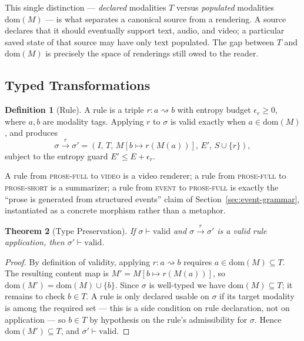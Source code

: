\documentclass[11pt]{article}
\newtheorem{theorem}{Theorem}[section]
\theoremstyle{definition}
\newtheorem{definition}[theorem]{Definition}
\begin{document}
This single distinction --- \emph{declared} modalities $T$ versus \emph{populated} modalities $\mathrm{dom}(M)$ --- is what separates a canonical source from a rendering. A source declares that it should eventually support text, audio, and video; a particular saved state of that source may have only text populated. The gap between $T$ and $\mathrm{dom}(M)$ is precisely the space of renderings still owed to the reader.

\subsection{Typed Transformations}

\begin{definition}[Rule]
\label{def:rule}
A rule is a triple $r : a \rightsquigarrow b$ with entropy budget $\epsilon_r \geq 0$, where $a, b$ are modality tags. Applying $r$ to $\sigma$ is valid exactly when $a \in \mathrm{dom}(M)$, and produces
\[
\sigma \xrightarrow{r} \sigma' = (I,\, T,\, M[b \mapsto r(M(a))],\, E',\, S \cup \{r\}),
\]
subject to the entropy guard $E' \leq E + \epsilon_r$.
\end{definition}

A rule from \textsc{prose-full} to \textsc{video} is a video renderer; a rule from \textsc{prose-full} to \textsc{prose-short} is a summarizer; a rule from \textsc{event} to \textsc{prose-full} is exactly the ``prose is generated from structured events'' claim of Section~\ref{sec:event-grammar}, instantiated as a concrete morphism rather than a metaphor.

\begin{theorem}[Type Preservation]
\label{thm:preservation}
If $\sigma \vdash \mathrm{valid}$ and $\sigma \xrightarrow{r} \sigma'$ is a valid rule application, then $\sigma' \vdash \mathrm{valid}$.
\end{theorem}

\begin{proof}
By definition of validity, applying $r : a \rightsquigarrow b$ requires $a \in \mathrm{dom}(M) \subseteq T$. The resulting content map is $M' = M[b \mapsto r(M(a))]$, so $\mathrm{dom}(M') = \mathrm{dom}(M) \cup \{b\}$. Since $\sigma$ is well-typed we have $\mathrm{dom}(M) \subseteq T$; it remains to check $b \in T$. A rule is only declared usable on $\sigma$ if its target modality is among the required set --- this is a side condition on rule declaration, not on application --- so $b \in T$ by hypothesis on the rule's admissibility for $\sigma$. Hence $\mathrm{dom}(M') \subseteq T$, and $\sigma' \vdash \mathrm{valid}$.
\end{proof}
\end{document}
